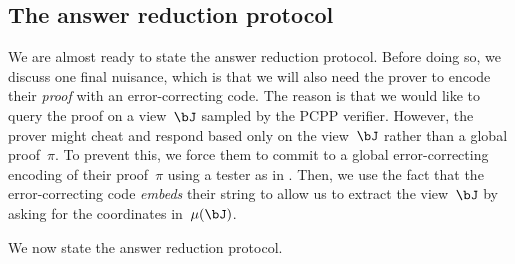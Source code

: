 \documentclass[11pt]{article}
\begin{document}
\subsection{The answer reduction protocol}

We are almost ready to state the answer reduction protocol.
Before doing so, we discuss one final nuisance, which is that we will also need the prover to encode their \emph{proof} with an error-correcting code. 
The reason is that we would like to query the proof on a view~$\bJ$ sampled by the PCPP verifier.
However, the prover might cheat and respond based only on the view~$\bJ$ rather than a global proof~$\pi$.
To prevent this, we force them to commit to a global error-correcting encoding of their proof~$\pi$ using a tester as in .
Then, we use the fact that the error-correcting code \emph{embeds} their string to allow us to extract the view~$\bJ$ by asking for the coordinates in~$\mu(\bJ)$.

We now state the answer reduction protocol.
\end{document}
